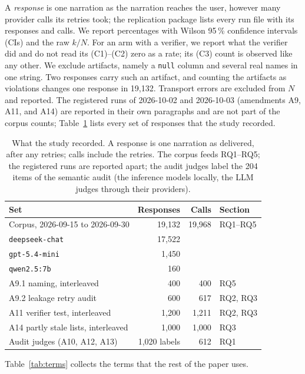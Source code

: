 \documentclass[journal]{IEEEtran}
\begin{document}
A \emph{response} is one narration as the narration reaches the user,
however many provider calls its retries took; the replication package lists every run file
with its responses and calls. We report percentages with Wilson 95\,\%
confidence intervals (CIs) and the raw $k/N$. For an arm with a verifier, we
report what the verifier did and do not read its (C1)--(C2) zero as a rate;
its (C3) count is observed like any other. We exclude artifacts, namely a
\texttt{null} column and several real names in one string. Two responses carry
such an artifact, and counting the artifacts as violations changes one
response in 19{,}132. Transport errors are excluded from $N$ and reported. The registered
runs of 2026-10-02 and 2026-10-03 (amendments A9, A11, and A14) are reported
in their own paragraphs and are not part of the corpus counts;
Table~\ref{tab:inventory} lists every set of responses that the study
recorded.

\begin{table}[!htbp]
\caption{What the study recorded. A response is one narration as delivered,
after any retries; calls include the retries. The corpus feeds RQ1--RQ5; the
registered runs are reported apart; the audit judges label the 204 items of
the semantic audit (the inference models locally, the LLM judges through
their providers).}
\label{tab:inventory}
\centering
\footnotesize
\setlength{\tabcolsep}{3pt}
\begin{tabular}{@{}lrrl@{}}
\toprule
Set & Responses & Calls & Section \\
\midrule
Corpus, 2026-09-15 to 2026-09-30 & 19{,}132 & 19{,}968 & RQ1--RQ5 \\
\quad \texttt{deepseek-chat} & 17{,}522 & & \\
\quad \texttt{gpt-5.4-mini} & 1{,}450 & & \\
\quad \texttt{qwen2.5:7b} & 160 & & \\
A9.1 naming, interleaved & 400 & 400 & RQ5 \\
A9.2 leakage retry audit & 600 & 617 & RQ2, RQ3 \\
A11 verifier test, interleaved & 1{,}200 & 1{,}211 & RQ2, RQ3 \\
A14 partly stale lists, interleaved & 1{,}000 & 1{,}000 & RQ3 \\
Audit judges (A10, A12, A13) & 1{,}020 labels & 612 & RQ1 \\
\bottomrule
\end{tabular}
\end{table}
Table~\ref{tab:terms} collects the terms that the rest of the paper uses.
\end{document}
